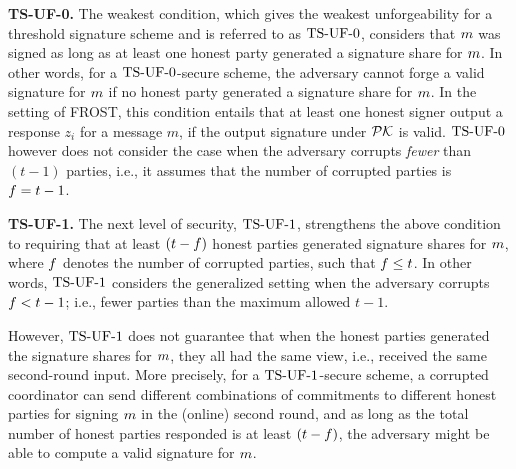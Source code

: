 \textbf{TS-UF-0.} The weakest condition,
which gives the weakest unforgeability for a threshold signature scheme 
and is referred to as $\mathrm{TS}\mbox{-}\mathrm{UF}\mbox{-}{0}$, considers that $m$ was signed as long as at least one honest party generated a signature share for $m$.
In other words, for a $\mathrm{TS}\mbox{-}\mathrm{UF}\mbox{-}{0}$-secure scheme, the adversary cannot forge a valid signature for $m$ if no honest party generated a signature share for $m$. 
In the setting of FROST,
this condition entails that at least one honest signer output a response $z_i$ for a message $m$,
if the output signature under $\mathcal{PK}$ is valid. 
$\mathrm{TS}\mbox{-}\mathrm{UF}\mbox{-}{0}$ however does not consider the case when the adversary corrupts \emph{fewer} than $(t-1)$ parties,
i.e., it assumes that the number of corrupted parties is $f = t-1$. 

\medskip

\textbf{TS-UF-1.} The next level of security, $\mathrm{TS}\mbox{-}\mathrm{UF}\mbox{-}{1}$, strengthens the above condition to requiring that at least  $(t - f)$ honest parties generated signature shares for $m$,
where $f$ denotes the number of corrupted parties, 
such that $f \leq t$. 
In other words,
$\mathrm{TS}\mbox{-}\mathrm{UF}\mbox{-}{1}$ considers the generalized setting when the adversary corrupts $f < t-1$;
i.e., fewer parties than the maximum allowed $t-1$. 

 However, $\mathrm{TS}\mbox{-}\mathrm{UF}\mbox{-}{1}$ does not guarantee that when the honest parties generated the signature shares for $m$, they all had the same view, i.e., received the same second-round input.
More precisely, for a $\mathrm{TS}\mbox{-}\mathrm{UF}\mbox{-}{1}$-secure scheme, a corrupted coordinator can send different combinations of commitments to different honest parties for signing $m$ in the (online) second round,
and as long as the total number of honest parties responded is at least $(t-f)$, the adversary might be able to compute a valid signature for $m$.

